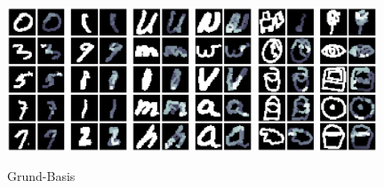 \begin{figure}[!ht]
    \centering
    \includegraphics[width=0.32\textwidth]{images/resultate/base-base-mnist.png}
    \includegraphics[width=0.32\textwidth]{images/resultate/base-base-emnist.png}
    \includegraphics[width=0.32\textwidth]{images/resultate/base-base-quickdraw.png}
    \caption{Grund-Basis}
    \label{fig:Grund-Basis}
\end{figure}

